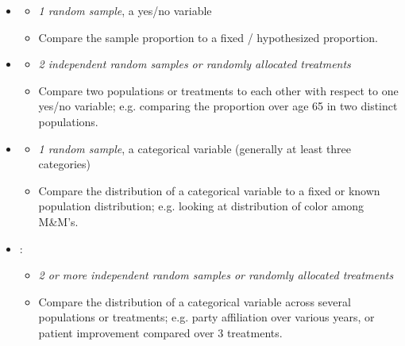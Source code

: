 \begin{itemize}\vspace{-2mm}
\setlength{\itemsep}{0mm}
\item {}
\begin{itemize}\vspace{-1mm}
\setlength{\itemsep}{0mm}
\item \emph{1 random sample}, a yes/no variable
\item Compare the sample proportion to a fixed / hypothesized proportion.
\end{itemize}

\item {}
\begin{itemize}\vspace{-2mm}
\setlength{\itemsep}{0mm}
\item \emph{2 independent random samples or randomly allocated treatments}
\item Compare two populations or treatments to each other with respect to one yes/no variable; e.g. comparing the proportion over age 65 in two distinct populations.
\end{itemize}

\item {}
\begin{itemize}\vspace{-2mm}
\setlength{\itemsep}{0mm}
\item \emph{1 random sample}, a categorical variable (generally at least three categories)
\item Compare the distribution of a categorical variable to a fixed or known population distribution; e.g. looking at distribution of color among M\&M's. 
\end{itemize}

\item {}: 
\begin{itemize}\vspace{-2mm}
\setlength{\itemsep}{0mm}
\item \emph{2 or more independent random samples or randomly allocated treatments} 
\item Compare the distribution of a categorical variable across several populations or treatments; e.g. party affiliation over various years, or patient improvement compared over 3 treatments.
\end{itemize}


\end{itemize}
